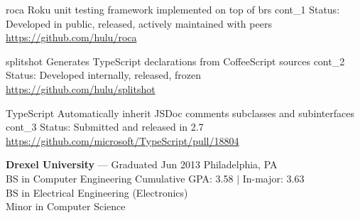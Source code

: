 \documentclass[10pt]{barag_resume}
\begin{document}
    \begin{project}
        {roca}
        {Roku unit testing framework implemented on top of brs}
        {cont_1}
            Status: Developed in public, released, actively maintained with peers\\
            \url{https://github.com/hulu/roca}
    \end{project}

    \begin{project}
        {splitshot}
        {Generates TypeScript declarations from CoffeeScript sources}
        {cont_2}
            Status: Developed internally, released, frozen\\
            \url{https://github.com/hulu/splitshot}
    \end{project}

    \begin{project}
        {TypeScript}
        {Automatically inherit JSDoc comments subclasses and subinterfaces}
        {cont_3}
            Status: Submitted and released in 2.7\\
            \url{https://github.com/microsoft/TypeScript/pull/18804}
    \end{project}


\relax
    {\large\textbf{Drexel University}} --- Graduated Jun 2013 \hfill{\small Philadelphia, PA}\\
    BS in Computer Engineering \hfill Cumulative GPA: 3.58 $|$ In-major: 3.63\\
    BS in Electrical Engineering (Electronics)\\
    Minor in Computer Science\\
\end{document}
